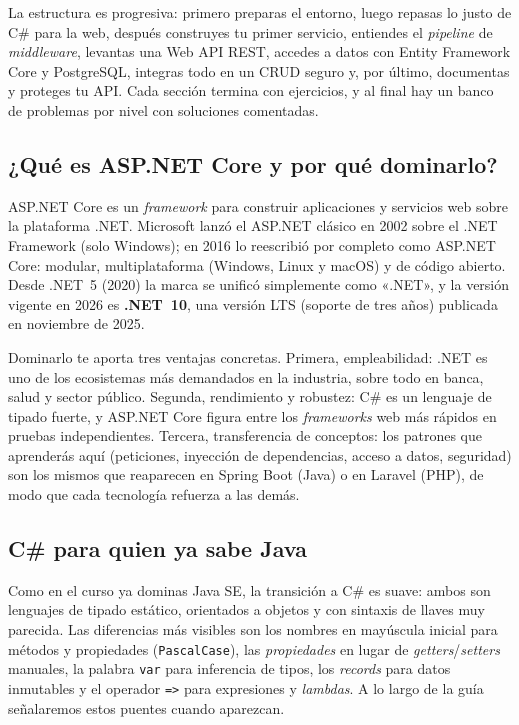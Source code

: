 \documentclass[11pt]{article}
\begin{document}
La estructura es progresiva: primero preparas el entorno, luego repasas lo justo de C\# para la web, después construyes tu primer servicio, entiendes el \emph{pipeline} de \emph{middleware}, levantas una Web API REST, accedes a datos con Entity Framework Core y PostgreSQL, integras todo en un CRUD seguro y, por último, documentas y proteges tu API. Cada sección termina con ejercicios, y al final hay un banco de problemas por nivel con soluciones comentadas.

\subsection{¿Qué es ASP.NET Core y por qué dominarlo?}
ASP.NET Core es un \emph{framework} para construir aplicaciones y servicios web sobre la plataforma .NET. Microsoft lanzó el ASP.NET clásico en 2002 sobre el .NET Framework (solo Windows); en 2016 lo reescribió por completo como ASP.NET Core: modular, multiplataforma (Windows, Linux y macOS) y de código abierto. Desde .NET~5 (2020) la marca se unificó simplemente como «.NET», y la versión vigente en 2026 es \textbf{.NET~10}, una versión LTS (soporte de tres años) publicada en noviembre de 2025.

Dominarlo te aporta tres ventajas concretas. Primera, empleabilidad: .NET es uno de los ecosistemas más demandados en la industria, sobre todo en banca, salud y sector público. Segunda, rendimiento y robustez: C\# es un lenguaje de tipado fuerte, y ASP.NET Core figura entre los \emph{frameworks} web más rápidos en pruebas independientes. Tercera, transferencia de conceptos: los patrones que aprenderás aquí (peticiones, inyección de dependencias, acceso a datos, seguridad) son los mismos que reaparecen en Spring Boot (Java) o en Laravel (PHP), de modo que cada tecnología refuerza a las demás.

\subsection{C\# para quien ya sabe Java}
Como en el curso ya dominas Java SE, la transición a C\# es suave: ambos son lenguajes de tipado estático, orientados a objetos y con sintaxis de llaves muy parecida. Las diferencias más visibles son los nombres en mayúscula inicial para métodos y propiedades (\texttt{PascalCase}), las \emph{propiedades} en lugar de \emph{getters}/\emph{setters} manuales, la palabra \texttt{var} para inferencia de tipos, los \emph{records} para datos inmutables y el operador \texttt{=>} para expresiones y \emph{lambdas}. A lo largo de la guía señalaremos estos puentes cuando aparezcan.
\end{document}
